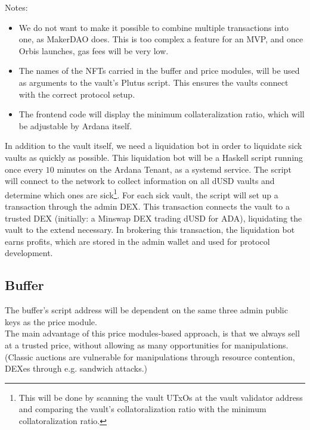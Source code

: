 \documentclass{article} %
\begin{document}
Notes:
\begin{itemize}
  \item We do not want to make it possible to combine multiple transactions into
    one, as MakerDAO does.
    This is too complex a feature for an MVP, and once Orbis launches, gas fees
    will be very low.
  \item The names of the NFTs carried in the buffer and price modules, will be
    used as arguments to the vault's Plutus script.
    This ensures the vaults connect with the correct protocol setup.
  \item The frontend code will display the minimum collateralization ratio, which
    will be adjustable by Ardana itself.
\end{itemize}

In addition to the vault itself, we need a liquidation bot in order to liquidate
sick vaults as quickly as possible.
This liquidation bot will be a Haskell script running once every $10$ minutes on
the Ardana Tenant, as a systemd service.
The script will connect to the network to collect information on all dUSD vaults
and determine which ones are sick\footnote{
  This will be done by scanning the vault UTxOs at the vault validator address
  and comparing the vault's collatoralization ratio with the minimum collatoralization
  ratio.
}.
For each sick vault, the script will set up a transaction through the admin DEX.
This transaction connects the vault to a trusted DEX (initially: a Minswap DEX
trading dUSD for ADA), liquidating the vault to the extend necessary.
In brokering this transaction, the liquidation bot earns profits, which are
stored in the admin wallet and used for protocol development.

\subsection{Buffer}

The buffer's script address will be dependent on the same three admin public
keys as the price module. \\

The main advantage of this price modules-based approach, is that we always sell
at a trusted price, without allowing as many opportunities for manipulations.
(Classic auctions are vulnerable for manipulations through resource contention,
DEXes through e.g. sandwich attacks.) \\
\end{document}
